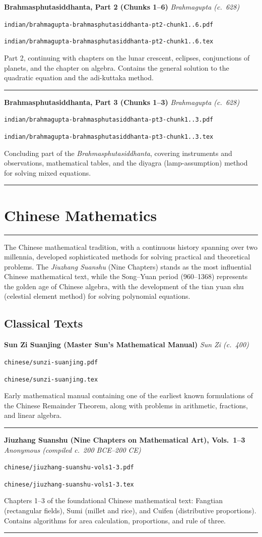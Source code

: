 \documentclass[11pt,a4paper]{article}
\newcommand{\workitem}[5]{%
  \par\smallskip
  \noindent\textbf{\large #1} \hfill \textit{#2}\par
  \noindent\texttt{\small #3}\par
  \noindent\texttt{\small #4}\par
  \noindent #5\par
  \smallskip\noindent\rule{\textwidth}{0.2pt}
}
\newcommand{\chinesesection}[1]{%
  \section[{#1}]{\textcolor{chinesecolor}{#1}}
}
\begin{document}
\workitem
  {Brahmasphutasiddhanta, Part 2 (Chunks 1--6)}
  {Brahmagupta (c.~628)}
  {indian/brahmagupta-brahmasphutasiddhanta-pt2-chunk1..6.pdf}
  {indian/brahmagupta-brahmasphutasiddhanta-pt2-chunk1..6.tex}
  {Part 2, continuing with chapters on the lunar crescent, eclipses, conjunctions of planets, and the chapter on algebra. Contains the general solution to the quadratic equation and the adi-kuttaka method.}

\workitem
  {Brahmasphutasiddhanta, Part 3 (Chunks 1--3)}
  {Brahmagupta (c.~628)}
  {indian/brahmagupta-brahmasphutasiddhanta-pt3-chunk1..3.pdf}
  {indian/brahmagupta-brahmasphutasiddhanta-pt3-chunk1..3.tex}
  {Concluding part of the \textit{Brahmasphutasiddhanta}, covering instruments and observations, mathematical tables, and the diyagra (lamp-assumption) method for solving mixed equations.}

\newpage

\chinesesection{Chinese Mathematics}
\label{sec:chinese}

\begin{center}
\textcolor{chinesecolor}{\rule{0.8\textwidth}{1pt}}
\end{center}

The Chinese mathematical tradition, with a continuous history spanning over two millennia, developed sophisticated methods for solving practical and theoretical problems. The \textit{Jiuzhang Suanshu} (Nine Chapters) stands as the most influential Chinese mathematical text, while the Song--Yuan period (960--1368) represents the golden age of Chinese algebra, with the development of the tian yuan shu (celestial element method) for solving polynomial equations.

\subsection*{Classical Texts}

\workitem
  {Sun Zi Suanjing (Master Sun's Mathematical Manual)}
  {Sun Zi (c.~400)}
  {chinese/sunzi-suanjing.pdf}
  {chinese/sunzi-suanjing.tex}
  {Early mathematical manual containing one of the earliest known formulations of the Chinese Remainder Theorem, along with problems in arithmetic, fractions, and linear algebra.}

\workitem
  {Jiuzhang Suanshu (Nine Chapters on Mathematical Art), Vols.~1--3}
  {Anonymous (compiled c.~200 BCE--200 CE)}
  {chinese/jiuzhang-suanshu-vols1-3.pdf}
  {chinese/jiuzhang-suanshu-vols1-3.tex}
  {Chapters 1--3 of the foundational Chinese mathematical text: Fangtian (rectangular fields), Sumi (millet and rice), and Cuifen (distributive proportions). Contains algorithms for area calculation, proportions, and rule of three.}
\end{document}
